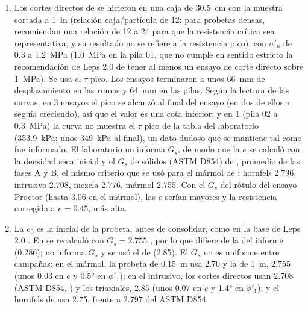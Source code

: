 \documentclass[11pt,letterpaper]{article}
\begin{document}
\begin{enumerate}
\item Los cortes directos de \citet{anddes2024} se hicieron en una caja de 30.5~cm con la muestra cortada a 1~in (relación caja/partícula de 12; para probetas densas, \citealp[p.~297]{ovalle2023} recomiendan una relación de 12 a 24 para que la resistencia crítica sea representativa, y su resultado no se refiere a la resistencia pico), con $\sigma'_n$ de 0.3 a 1.2~MPa (1.0~MPa en la pila 01, que no cumple en sentido estricto la recomendación de Leps 2.0 de tener al menos un ensayo de corte directo sobre 1~MPa). Se usa el $\tau$ pico. Los ensayos terminaron a unos 66~mm de desplazamiento en las rumas y 64~mm en las pilas. Según la lectura de las curvas, en 3 ensayos el pico se alcanzó al final del ensayo (en dos de ellos $\tau$ seguía creciendo), así que el valor es una cota inferior; y en 1 (pila 02 a 0.3~MPa) la curva no muestra el $\tau$ pico de la tabla del laboratorio (353.9~kPa; unos 349~kPa al final), un dato dudoso que se mantiene tal como fue informado. El laboratorio no informa $G_s$, de modo que la $e$ se calculó con la densidad seca inicial y el $G_s$ de sólidos (ASTM D854) de \citet[p.~49]{g2010}, promedio de las fases A y B, el mismo criterio que se usó para el mármol de \citet{g2012}: hornfels 2.796, intrusivo 2.708, mezcla 2.776, mármol 2.755. Con el $G_s$ del rótulo del ensayo Proctor (hasta 3.06 en el mármol), las $e$ serían mayores y la resistencia corregida a $e = 0.45$, más alta.
\item La $e_0$ es la inicial de la probeta, antes de consolidar, como en la base de Leps 2.0 \citep[p.~4 y Tabla~2]{cylwik}. En \citet{g2012} se recalculó con $G_s = 2.755$ \citep{g2010}, por lo que difiere de la del informe (0.286); \citet{i2025} no informa $G_s$ y se usó el de \citet{w2024} (2.85). El $G_s$ no es uniforme entre campañas: en el mármol, la probeta de 0.15~m usa 2.70 y la de 1~m, 2.755 (unos 0.03 en $e$ y 0.5° en $\phi'_1$); en el intrusivo, los cortes directos usan 2.708 (ASTM D854, \citealp{g2010}) y los triaxiales, 2.85 (unos 0.07 en $e$ y 1.4° en $\phi'_1$); y el hornfels de \citet{w2022} usa 2.75, frente a 2.797 del ASTM D854.
\end{enumerate}
\end{document}
